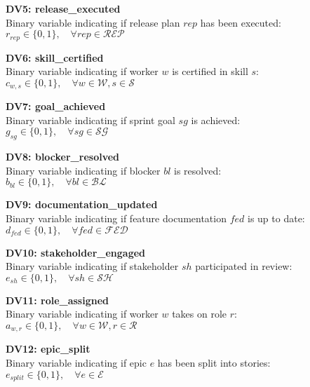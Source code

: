 \documentclass[12pt]{article}
\begin{document}
    \item \textbf{DV5: release\_executed} \\
    Binary variable indicating if release plan $rep$ has been executed: \\
    $r_{rep} \in \{0,1\}, \quad \forall rep \in \mathcal{REP}$

    \item \textbf{DV6: skill\_certified} \\
    Binary variable indicating if worker $w$ is certified in skill $s$: \\
    $c_{w,s} \in \{0,1\}, \quad \forall w \in \mathcal{W}, s \in \mathcal{S}$

    \item \textbf{DV7: goal\_achieved} \\
    Binary variable indicating if sprint goal $sg$ is achieved: \\
    $g_{sg} \in \{0,1\}, \quad \forall sg \in \mathcal{SG}$

    \item \textbf{DV8: blocker\_resolved} \\
    Binary variable indicating if blocker $bl$ is resolved: \\
    $b_{bl} \in \{0,1\}, \quad \forall bl \in \mathcal{BL}$

    \item \textbf{DV9: documentation\_updated} \\
    Binary variable indicating if feature documentation $fed$ is up to date: \\
    $d_{fed} \in \{0,1\}, \quad \forall fed \in \mathcal{FED}$

    \item \textbf{DV10: stakeholder\_engaged} \\
    Binary variable indicating if stakeholder $sh$ participated in review: \\
    $e_{sh} \in \{0,1\}, \quad \forall sh \in \mathcal{SH}$

    \item \textbf{DV11: role\_assigned} \\
    Binary variable indicating if worker $w$ takes on role $r$: \\
    $a_{w,r} \in \{0,1\}, \quad \forall w \in \mathcal{W}, r \in \mathcal{R}$

    \item \textbf{DV12: epic\_split} \\
    Binary variable indicating if epic $e$ has been split into stories: \\
    $e_{split} \in \{0,1\}, \quad \forall e \in \mathcal{E}$
\end{document}

